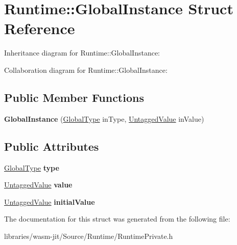 \hypertarget{struct_runtime_1_1_global_instance}{}\section{Runtime\+:\+:Global\+Instance Struct Reference}
\label{struct_runtime_1_1_global_instance}


Inheritance diagram for Runtime\+:\+:Global\+Instance\+:


Collaboration diagram for Runtime\+:\+:Global\+Instance\+:
\subsection*{Public Member Functions}
\begin{DoxyCompactItemize}
\item 
\mbox{\label{struct_runtime_1_1_global_instance_a28074a9a2af4d40dbf0af9f086c4b46b}} 
{\bfseries Global\+Instance} (\mbox{\hyperlink{struct_i_r_1_1_global_type}{Global\+Type}} in\+Type, \mbox{\hyperlink{struct_runtime_1_1_untagged_value}{Untagged\+Value}} in\+Value)
\end{DoxyCompactItemize}
\subsection*{Public Attributes}
\begin{DoxyCompactItemize}
\item 
\mbox{\label{struct_runtime_1_1_global_instance_a46919f37063d827462fcc6e48f4b196b}} 
\mbox{\hyperlink{struct_i_r_1_1_global_type}{Global\+Type}} {\bfseries type}
\item 
\mbox{\label{struct_runtime_1_1_global_instance_a1e9e2bec9cfb4f5e36dd9cf86bb0ffd9}} 
\mbox{\hyperlink{struct_runtime_1_1_untagged_value}{Untagged\+Value}} {\bfseries value}
\item 
\mbox{\label{struct_runtime_1_1_global_instance_acce7627dec7f4f9a78118433a2286a76}} 
\mbox{\hyperlink{struct_runtime_1_1_untagged_value}{Untagged\+Value}} {\bfseries initial\+Value}
\end{DoxyCompactItemize}


The documentation for this struct was generated from the following file\+:\begin{DoxyCompactItemize}
\item 
libraries/wasm-\/jit/\+Source/\+Runtime/Runtime\+Private.\+h\end{DoxyCompactItemize}
